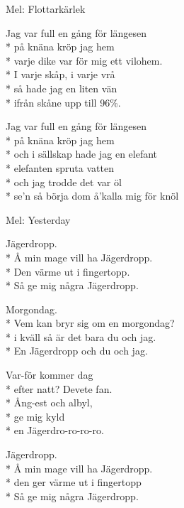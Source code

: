 \begin{SongText}[Fyllerian]
    \begin{SongInfo}
        Mel: Flottarkärlek
    \end{SongInfo}
    \begin{SongVerse}
        Jag var full en gång för längesen\\*%
        på knäna kröp jag hem\\*%
        varje dike var för mig ett vilohem.\\*%
        I varje skåp, i varje vrå\\*%
        så hade jag en liten vän\\*%
        ifrån skåne upp till 96\%.
    \end{SongVerse}
    \begin{SongVerse}
        Jag var full en gång för längesen\\*%
        på knäna kröp jag hem\\*%
        och i sällskap hade jag en elefant\\*%
        elefanten spruta vatten\\*%
        och jag trodde det var öl\\*%
        se’n så börja dom å’kalla mig för knöl
    \end{SongVerse}
\end{SongText}
\begin{SongText}
    \begin{SongInfo}
        Mel: Yesterday
    \end{SongInfo}
    \begin{SongVerse}
        Jägerdropp.\\*%
        Å min mage vill ha Jägerdropp.\\*%
        Den värme ut i fingertopp.\\*%
        Så ge mig några Jägerdropp.
    \end{SongVerse}
    \begin{SongVerse}
        Morgondag.\\*%
        Vem kan bryr sig om en morgondag?\\*%
        i kväll så är det bara du och jag.\\*%
        En Jägerdropp och du och jag.
    \end{SongVerse}
    \begin{SongVerse}
        Var-för kommer dag\\*%
        efter natt? Devete fan.\\*%
        Ång-est och albyl,\\*%
        ge mig kyld\\*%
        en Jägerdro-ro-ro-ro.
    \end{SongVerse}
    \begin{SongVerse}
        Jägerdropp.\\*%
        Å min mage vill ha Jägerdropp.\\*%
        den ger värme ut i fingertopp\\*%
        Så ge mig några Jägerdropp.
    \end{SongVerse}
\end{SongText}
